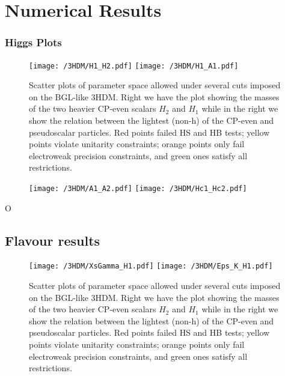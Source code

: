 \section{Numerical Results}

\subsubsection{Higgs Plots}



\begin{figure}[H]
	\centering
	\texttt{[image: /3HDM/H1\_H2.pdf]}
	\texttt{[image: /3HDM/H1\_A1.pdf]}
	\caption{Scatter plots of parameter space allowed under  several cuts imposed on the BGL-like 3HDM. Right we have the plot showing the masses of the two heavier CP-even scalars $H_2$ and $H_1$ while in the right we show the relation between the lightest
(non-h) of the CP-even and pseudoscalar particles. Red points failed HS and HB tests; yellow points violate unitarity constraints; orange points only fail electroweak precision constraints, and green ones satisfy all restrictions.}
	\label{fig:H1_A1_Plots}
\end{figure}	

\begin{figure}[H]
	\centering
	\texttt{[image: /3HDM/A1\_A2.pdf]}
	\texttt{[image: /3HDM/Hc1\_Hc2.pdf]}
	\caption{}
	\label{fig:Other_H_plots}
\end{figure}	
%
O
%
\subsection{Flavour results}

\begin{figure}[H]
	\centering
	\texttt{[image: /3HDM/XsGamma\_H1.pdf]}
	\texttt{[image: /3HDM/Eps\_K\_H1.pdf]}
	\caption{Scatter plots of parameter space allowed under  several cuts imposed on the BGL-like 3HDM. Right we have the plot showing the masses of the two heavier CP-even scalars $H_2$ and $H_1$ while in the right we show the relation between the lightest
(non-h) of the CP-even and pseudoscalar particles. Red points failed HS and HB tests; yellow points violate unitarity constraints; orange points only fail electroweak precision constraints, and green ones satisfy all restrictions.}
	\label{fig:PT_plots_H1}
\end{figure}	



